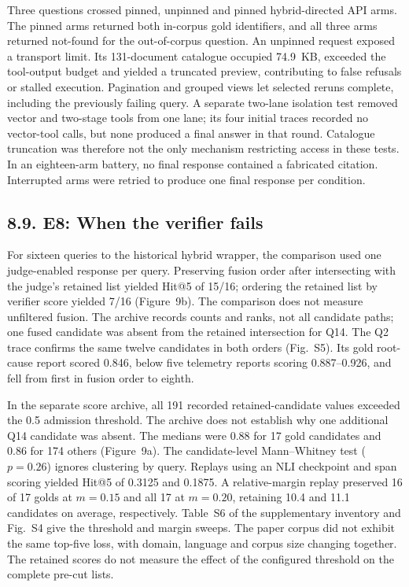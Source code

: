 Three questions crossed pinned, unpinned and pinned hybrid-directed API
arms. The pinned arms returned both in-corpus gold identifiers, and all
three arms returned not-found for the out-of-corpus question. An unpinned
request exposed a transport limit. Its 131-document catalogue occupied
74.9~KB, exceeded the tool-output budget and yielded a truncated
preview, contributing to false refusals or stalled execution. Pagination and
grouped views let selected reruns complete, including the previously
failing query. A separate two-lane isolation test removed vector and
two-stage tools from one lane; its four initial traces recorded no vector-tool
calls, but none produced a final answer in that round. Catalogue truncation
was therefore not the only mechanism restricting access in these tests. In an
eighteen-arm battery, no final response contained a fabricated citation.
Interrupted arms were retried to produce one final response per condition.

\subsection{8.9. E8: When the verifier fails}


For sixteen queries to the historical hybrid wrapper, the comparison used
one judge-enabled response per query. Preserving fusion order after
intersecting with the judge's retained list yielded Hit@5 of 15/16;
ordering the retained list by verifier score yielded 7/16
(Figure~9b). The comparison does not measure unfiltered
fusion. The archive records counts and ranks, not all candidate paths;
one fused candidate was absent from the retained intersection for Q14.
The Q2 trace confirms the same twelve candidates in both orders (Fig.~S5).
Its gold root-cause report scored 0.846, below five telemetry reports
scoring 0.887--0.926, and fell from first in fusion order to eighth.

In the separate score archive, all 191 recorded retained-candidate values
exceeded the 0.5 admission threshold. The archive does not establish why
one additional Q14 candidate was absent. The medians were 0.88 for 17 gold
candidates and 0.86 for 174 others (Figure~9a). The
candidate-level Mann--Whitney test ($p=0.26$) ignores clustering by query.
Replays using an NLI checkpoint and span scoring yielded Hit@5 of 0.3125
and 0.1875. A relative-margin replay preserved 16 of 17 golds at $m=0.15$
and all 17 at $m=0.20$, retaining 10.4 and 11.1 candidates on average,
respectively. Table~S6 of the supplementary inventory and Fig.~S4 give the
threshold and margin sweeps. The paper corpus did not exhibit the same
 top-five loss, with domain, language and corpus size changing together.
The retained scores do not measure the effect of the configured threshold
on the complete pre-cut lists.

